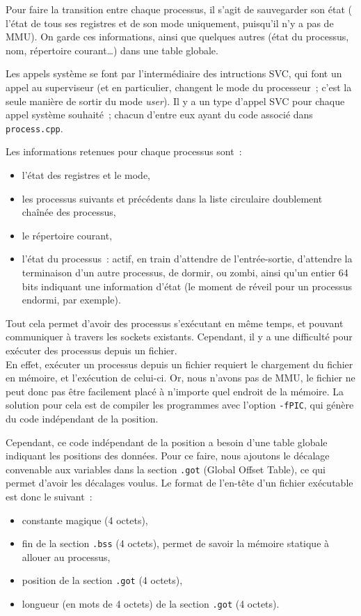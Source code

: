 \documentclass[11pt,a4paper]{article}
\newcommand{\fname}[1]{\texttt{#1}} %
\begin{document}
Pour faire la transition entre chaque processus, il s'agit de
sauvegarder son état (\ie{} l'état de tous ses registres et de son mode
uniquement, puisqu'il n'y a pas de MMU). On garde ces informations,
ainsi que quelques autres (état du processus, nom, répertoire
courant\ldots) dans une table globale.

Les appels système se font par l'intermédiaire des intructions SVC,
qui font un appel au superviseur (et en particulier, changent le mode
du processeur~; c'est la seule manière de sortir du mode
\textit{user}). Il y a un type d'appel SVC pour chaque appel système
souhaité~; chacun d'entre eux ayant du code associé dans
\fname{process.cpp}.

Les informations retenues pour chaque processus sont~:
\begin{itemize}
\item{l'état des registres et le mode,}
\item{les processus suivants et précédents dans la liste circulaire
  doublement chaînée des processus,}
\item{le répertoire courant,}
\item{l'état du processus~: actif, en train d'attendre de
  l'entrée-sortie, d'attendre la terminaison d'un autre processus,
  de dormir, ou zombi, ainsi qu'un entier 64 bits indiquant une
  information d'état (le moment de réveil pour un processus endormi,
  par exemple).}
\end{itemize}

Tout cela permet d'avoir des processus s'exécutant en même temps, et
pouvant communiquer à travers les sockets existants. Cependant, il
y a une difficulté pour exécuter des processus depuis un fichier.
\\

En effet, exécuter un processus depuis un fichier requiert le
chargement du fichier en mémoire, et l'exécution de celui-ci. Or, nous
n'avons pas de MMU, le fichier ne peut donc pas être facilement placé
à n'importe quel endroit de la mémoire. La solution pour cela est de
compiler les programmes avec l'option \texttt{-fPIC}, qui génère du
code indépendant de la position.

Cependant, ce code indépendant de la position a besoin d'une table
globale indiquant les positions des données. Pour ce faire, nous
ajoutons le décalage convenable aux variables dans la section
\texttt{.got} (Global Offset Table), ce qui permet d'avoir les
décalages voulus. Le format de l'en-tête d'un fichier exécutable est
donc le suivant~:
\begin{itemize}
\item{constante magique  (4 octets),} %
\item{fin de la section \texttt{.bss} (4 octets), permet de savoir la
  mémoire statique à allouer au processus,}
\item{position de la section \texttt{.got} (4 octets),}
\item{longueur (en mots de 4 octets) de la section \texttt{.got} (4 octets).\\}
\end{itemize}
\end{document}
